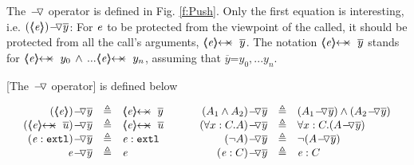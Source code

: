 
The  $ { } \!-\!\!\!\,\!{\triangledown} { } $  operator is  defined in Fig. \ref{f:Push}. 
Only the first equation is interesting, i.e.  $\PushAS y {(\inside \re)}$: For 
$\mathit{e}$ to be protected from the viewpoint of the called, it should be protected from all the call's arguments,
\ie  $\protectedFrom {\re} {\overline {y}}$. 
The notation $\protectedFrom {\re} {\overline {y}}$   stands for $\protectedFrom \re {y_0}\, \wedge\, ...  \protectedFrom \re {y_n}$, assuming that $\overline y$=${y_0, ... y_n}$.



\begin{definition}
\label{def:push}
[The $ { } \!-\!\!\!\,\!{\triangledown} { } $  operator] is  defined below

$
\begin{array}{c}
\begin{array}{l}
\begin{array}{rclcrcl}
  \PushAS y {(\inside \re)} & \triangleq &  \protectedFrom \re {\overline {y} }
  & \ \ \  \ &
  \PushAS y   {(A_1  \wedge  A_2)} & \triangleq &  (\PushAS y  { A_1})  \wedge  ( \PushAS y  {A_2} )  
\\ 
 \PushAS y {(\protectedFrom \re {\overline {u}})} &  \triangleq& \protectedFrom \re {\overline {u}} 
  & &
 \PushAS y  {(\forall x:C.A)} & \triangleq & \forall x:C.({\PushAS y A} )  
  \\  
  \PushAS y  {(\external \re)} &  \triangleq & {\external \re}  %
  & & 
  \PushAS y  {(\neg A)} &  \triangleq & \neg( {\PushAS y A} )  
    \\
     \PushAS y  {\re} &  \triangleq&   \re %
    & &
    \PushAS y  {(\re:C)} &  \triangleq&   \re:C 
 \end{array}
\end{array}
\end{array}
$
\label{f:Push}
\end{definition}

